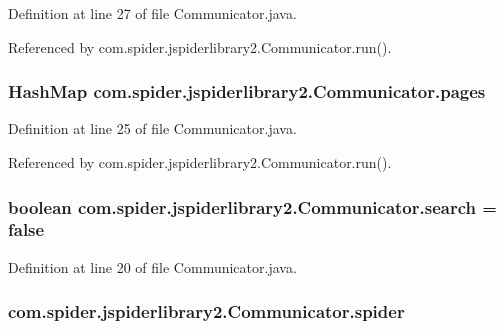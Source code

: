 \-Definition at line 27 of file \-Communicator.\-java.



\-Referenced by com.\-spider.\-jspiderlibrary2.\-Communicator.\-run().

\hypertarget{classcom_1_1spider_1_1jspiderlibrary2_1_1_communicator_a0c07a2143b8d612dd3a37f0ea948c458}{
\subsubsection[{pages}]{\setlength{\rightskip}{0pt plus 5cm}\-Hash\-Map {\bf com.\-spider.\-jspiderlibrary2.\-Communicator.\-pages}}}\label{classcom_1_1spider_1_1jspiderlibrary2_1_1_communicator_a0c07a2143b8d612dd3a37f0ea948c458}


\-Definition at line 25 of file \-Communicator.\-java.



\-Referenced by com.\-spider.\-jspiderlibrary2.\-Communicator.\-run().

\hypertarget{classcom_1_1spider_1_1jspiderlibrary2_1_1_communicator_af0e22c130c8e3180b699325c5258bd83}{
\subsubsection[{search}]{\setlength{\rightskip}{0pt plus 5cm}boolean {\bf com.\-spider.\-jspiderlibrary2.\-Communicator.\-search} = false}}\label{classcom_1_1spider_1_1jspiderlibrary2_1_1_communicator_af0e22c130c8e3180b699325c5258bd83}


\-Definition at line 20 of file \-Communicator.\-java.

\hypertarget{classcom_1_1spider_1_1jspiderlibrary2_1_1_communicator_ad0dd6511cd30b7ad8edfd359a21c6cc3}{
\subsubsection[{spider}]{ {\bf com.\-spider.\-jspiderlibrary2.\-Communicator.\-spider}}}\label{classcom_1_1spider_1_1jspiderlibrary2_1_1_communicator_ad0dd6511cd30b7ad8edfd359a21c6cc3}


